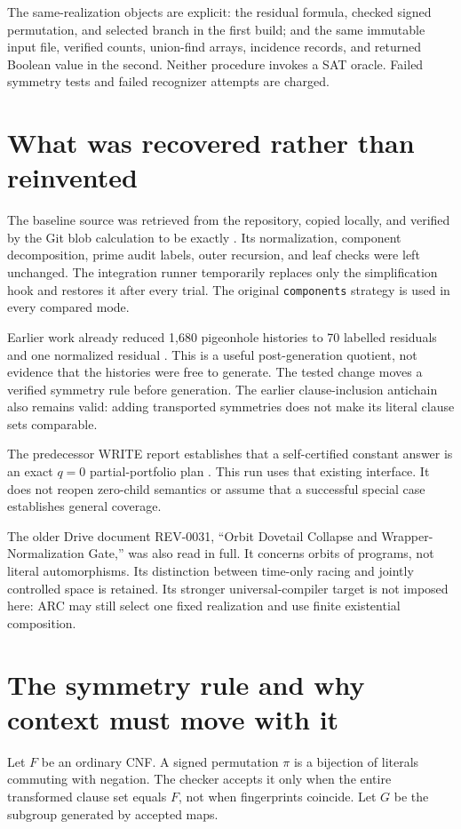 \documentclass[11pt]{article}
\begin{document}
The same-realization objects are explicit: the residual formula, checked signed permutation, and selected branch in the first build; and the same immutable input file, verified counts, union-find arrays, incidence records, and returned Boolean value in the second. Neither procedure invokes a SAT oracle. Failed symmetry tests and failed recognizer attempts are charged.

\section{What was recovered rather than reinvented}
The baseline source was retrieved from the repository, copied locally, and verified by the Git blob calculation to be exactly
 \cite{arc0005Baseline}. Its normalization, component decomposition, prime audit labels, outer recursion, and leaf checks were left unchanged. The integration runner temporarily replaces only the simplification hook and restores it after every trial. The original \texttt{components} strategy is used in every compared mode.

Earlier work already reduced 1,680 pigeonhole histories to 70 labelled residuals and one normalized residual \cite{arc0005HashAudit}. This is a useful post-generation quotient, not evidence that the histories were free to generate. The tested change moves a verified symmetry rule before generation. The earlier clause-inclusion antichain also remains valid: adding transported symmetries does not make its literal clause sets comparable.

The predecessor WRITE report establishes that a self-certified constant answer is an exact $q=0$ partial-portfolio plan \cite{arc0005Write002}. This run uses that existing interface. It does not reopen zero-child semantics or assume that a successful special case establishes general coverage.

The older Drive document REV-0031, ``Orbit Dovetail Collapse and Wrapper-Normalization Gate,'' was also read in full. It concerns orbits of programs, not literal automorphisms. Its distinction between time-only racing and jointly controlled space is retained. Its stronger universal-compiler target is not imposed here: ARC may still select one fixed realization and use finite existential composition.

\section{The symmetry rule and why context must move with it}
Let $F$ be an ordinary CNF. A signed permutation $\pi$ is a bijection of literals commuting with negation. The checker accepts it only when the entire transformed clause set equals $F$, not when fingerprints coincide. Let $G$ be the subgroup generated by accepted maps.
\end{document}
